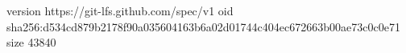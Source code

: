 version https://git-lfs.github.com/spec/v1
oid sha256:d534cd879b2178f90a035604163b6a02d01744c404ec672663b00ae73c0c0e71
size 43840
